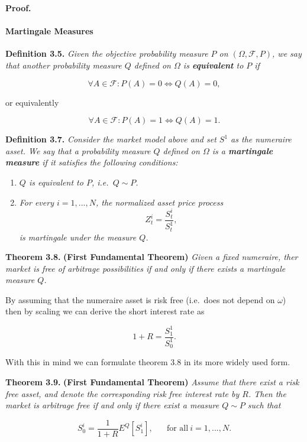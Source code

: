 \documentclass[
]{article}
\providecommand{\tightlist}{%
  \setlength{\itemsep}{0pt}\setlength{\parskip}{0pt}}
\begin{document}
\textbf{Proof.}

\hypertarget{martingale-measures}{%
\paragraph{Martingale Measures}\label{martingale-measures}}

\textbf{Definition 3.5.} \emph{Given the objective probability measure
\(P\) on \((\Omega,\mathcal{F},P)\), we say that another probability
measure \(Q\) defined on \(\Omega\) is \textbf{equivalent} to \(P\) if}

\[
\forall A\in\mathcal{F}:P(A)=0\iff Q(A)=0,
\]

or equivalently

\[
\forall A\in\mathcal{F}:P(A)=1\iff Q(A)=1.
\]

\textbf{Definition 3.7.} \emph{Consider the market model above and set
\(S^1\) as the numeraire asset. We say that a probability measure \(Q\)
defined on \(\Omega\) is a \textbf{martingale measure} if it satisfies
the following conditions:}

\begin{enumerate}
\def\labelenumi{\arabic{enumi}.}
\tightlist
\item
  \emph{\(Q\) is equivalent to \(P\), i.e.~\(Q\sim P\).}
\item
  \emph{For every \(i=1,...,N\), the normalized asset price process} \[
    Z_t^i=\frac{S_t^i}{S_t^1},
    \] \emph{is martingale under the measure \(Q\).}
\end{enumerate}

\textbf{Theorem 3.8.} \textbf{(First Fundamental Theorem)} \emph{Given a
fixed numeraire, ther market is free of arbitrage possibilities if and
only if there exists a martingale measure \(Q\).}

By assuming that the numeraire asset is risk free (i.e.~does not depend
on \(\omega\)) then by scaling we can derive the short interest rate as

\[
1+R=\frac{S_1^1}{S_0^1}.
\]

With this in mind we can formulate theorem 3.8 in its more widely used
form.

\textbf{Theorem 3.9.} \textbf{(First Fundamental Theorem)} \emph{Assume
that there exist a risk free asset, and denote the corresponding risk
free interest rate by \(R\). Then the market is arbitrage free if and
only if there exist a measure \(Q\sim P\) such that}

\[
S_0^i=\frac{1}{1+R}E^Q[S_1^i],\hspace{20pt}\text{for all}\ i=1,...,N.\tag{3.9}
\]
\end{document}
